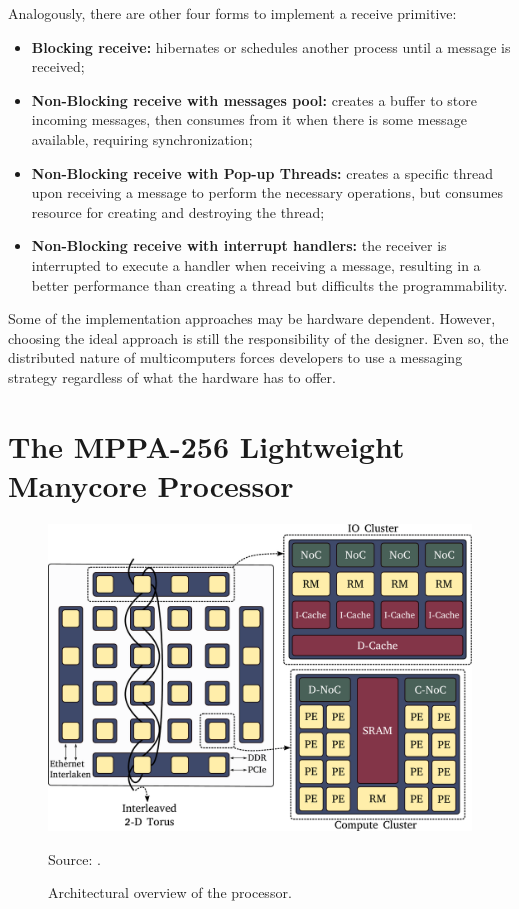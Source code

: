 				Analogously, there are other four forms to implement a receive primitive:
				\begin{itemize}
					\item \textbf{Blocking receive:} \cpu hibernates or schedules another
						process until a message is received;
					\item \textbf{Non-Blocking receive with messages pool:} \cpu creates
						a buffer to store incoming messages, then consumes from it when
						there is some message available, requiring synchronization;
					\item \textbf{Non-Blocking receive with Pop-up Threads:} creates a specific
						thread upon receiving a message to perform the necessary operations,
						but consumes resource for creating and destroying the thread;
					\item \textbf{Non-Blocking receive with interrupt handlers:} the receiver
						is interrupted to execute a handler when receiving a message, resulting
						in a better performance than creating a thread but difficults
						the programmability.
				\end{itemize}

				Some of the implementation approaches may be hardware dependent.
				However, choosing the ideal approach is still the responsibility of the \os designer.
				Even so, the distributed nature of multicomputers forces developers to
				use a messaging strategy regardless of what the hardware has to offer.

\section{The MPPA-256 Lightweight Manycore Processor}
\label{sec.mppa}

	\begin{figure}[t]
		\centering
		\caption{Architectural overview of the \mppa processor.}

		\includegraphics[width=.7\textwidth]{images/arch-mppa.pdf}

		Source: \cite{Penna2018}.

		\label{fig.mppa-arch}
	\end{figure}


